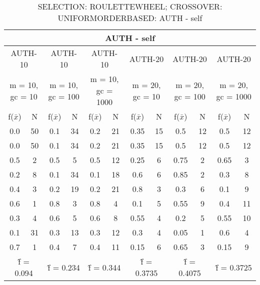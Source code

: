 \begin{table}[H]
	\centering
	\caption{SELECTION: ROULETTEWHEEL; CROSSOVER: UNIFORMORDERBASED: AUTH - self}
	\begin{adjustbox}{width=1\textwidth}
		\begin{tabular}{ |c|c||c|c||c|c||c|c||c|c||c|c| }
			\hline
			\multicolumn{12}{|c|}{AUTH - self} \\
			\hline
			\multicolumn{2}{|c||}{AUTH-10} & \multicolumn{2}{c||}{AUTH-10} & \multicolumn{2}{c||}{AUTH-10} & \multicolumn{2}{c||}{AUTH-20} & \multicolumn{2}{c||}{AUTH-20} & \multicolumn{2}{c|}{AUTH-20}\\
			\hline
			\multicolumn{2}{|c||}{m = 10, gc = 10} & \multicolumn{2}{c||}{m = 10, gc = 100} & \multicolumn{2}{c||}{m = 10, gc = 1000} & \multicolumn{2}{c||}{m = 20, gc = 10} & \multicolumn{2}{c||}{m = 20, gc = 100} & \multicolumn{2}{c|}{m = 20, gc = 1000}\\
			\hline
			f($\bar{x}$) & N & f($\bar{x}$) & N & f($\bar{x}$) & N & f($\bar{x}$) & N & f($\bar{x}$) & N & f($\bar{x}$) & N\\
			\hline
			\hline
			0.0 & 50 & 0.1 & 34 & 0.2 & 21 & 0.35 & 15 & 0.5 & 12 & 0.5 & 12\\
			\hline
			0.0 & 50 & 0.1 & 34 & 0.2 & 21 & 0.35 & 15 & 0.5 & 12 & 0.5 & 12\\
			0.5 & 2 & 0.5 & 5 & 0.5 & 12 & 0.25 & 6 & 0.75 & 2 & 0.65 & 3\\
			0.2 & 8 & 0.1 & 34 & 0.1 & 18 & 0.6 & 6 & 0.85 & 2 & 0.3 & 8\\
			0.4 & 3 & 0.2 & 19 & 0.2 & 21 & 0.8 & 3 & 0.3 & 6 & 0.1 & 9\\
			0.6 & 1 & 0.8 & 3 & 0.8 & 4 & 0.1 & 5 & 0.55 & 9 & 0.4 & 11\\
			0.3 & 4 & 0.6 & 5 & 0.6 & 8 & 0.55 & 4 & 0.2 & 5 & 0.55 & 10\\
			0.1 & 31 & 0.3 & 13 & 0.3 & 12 & 0.3 & 4 & 0.05 & 1 & 0.6 & 4\\
			0.7 & 1 & 0.4 & 7 & 0.4 & 11 & 0.15 & 6 & 0.65 & 3 & 0.15 & 9\\
			\hline
			\multicolumn{2}{|c||}{\^{f} = 0.094} & \multicolumn{2}{c||}{\^{f} = 0.234} & \multicolumn{2}{c||}{\^{f} = 0.344} & \multicolumn{2}{c||}{\^{f} = 0.3735} & \multicolumn{2}{c||}{\^{f} = 0.4075} & \multicolumn{2}{c|}{\^{f} = 0.3725}\\
			\hline
		\end{tabular}
	\end{adjustbox}
\end{table}
